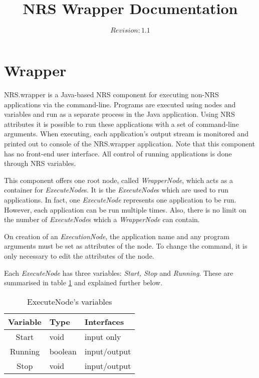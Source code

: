 \documentclass[10pt, notitlepage, a4paper]{article}
\begin{document}
\title{NRS Wrapper Documentation}
\author{$Revision: 1.1 $}
\maketitle

\section{Wrapper}
NRS.wrapper is a Java-based NRS component for executing non-NRS
applications via the command-line. Programs are executed using nodes and
variables and run as a separate process in the Java application. Using
NRS attributes it is possible to run these applications with a set of
command-line arguments. When executing, each application's output stream
is monitored and printed out to console of the NRS.wrapper
application. Note that this component has no front-end user
interface. All control of running applications is done through NRS variables.

This component offers one root node, called {\it WrapperNode}, which
acts as a container for {\it ExecuteNode}s. It is the {\it ExecuteNode}s
which are used to run applications. In fact, one {\it ExecuteNode} represents
one application to be run. However, each application can be run multiple
times. Also, there is no limit on the number of {\it ExecuteNode}s which
a {\it WrapperNode} can contain.

On creation of an {\it ExecutionNode}, the application name and any
program arguments must be set as attributes of the node. To change
the command, it is only necessary to edit the attributes of the node.

Each {\it ExecuteNode} has three variables: {\it Start, Stop} and {\it
  Running}. These are summarised in table \ref{execute_node_vars}
and explained further below.

\begin{table}[!ht]
\begin{center}
\label{execute_node_vars}
\caption{ExecuteNode's variables}
\begin{tabular}{|c|l|l|}
\hline Variable & Type & Interfaces\\ \hline
\hline Start & void & input only\\
\hline Running & boolean & input/output\\
\hline Stop & void & input/output\\
\hline
\end{tabular}
\end{center}
\end{table}
\end{document}
